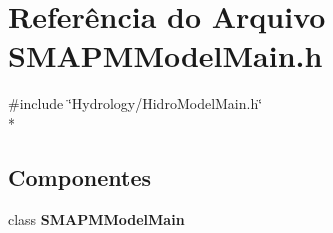 \section{Referência do Arquivo S\+M\+A\+P\+M\+Model\+Main.\+h}
\label{_s_m_a_p_m_model_main_8h}
{\ttfamily \#include \char`\"{}Hydrology/\+Hidro\+Model\+Main.\+h\char`\"{}}\\*
\subsection*{Componentes}
\begin{DoxyCompactItemize}
\item 
class {\bf S\+M\+A\+P\+M\+Model\+Main}
\end{DoxyCompactItemize}
